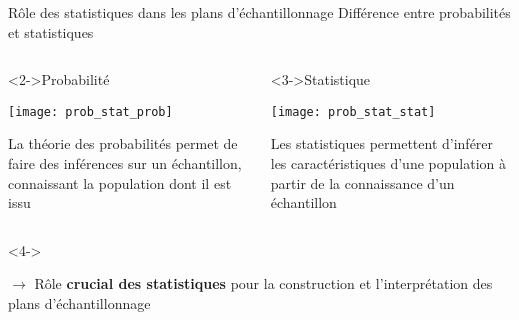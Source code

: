 \documentclass[10pt]{beamer}
\begin{document}
\begin{frame}{Rôle des statistiques dans les plans d’échantillonnage}
  Différence entre probabilités et statistiques
  \begin{columns}[c]
    \begin{column}[c]{0.5\textwidth}
      \begin{block}<2->{Probabilité}
        \begin{center}
          \texttt{[image: prob\_stat\_prob]}
        \end{center}
        \begin{small}
          La théorie des probabilités permet de faire des inférences sur un échantillon, connaissant la population dont il est issu
        \end{small}
      \end{block}
    \end{column}
    \begin{column}[c]{0.5\textwidth}
      \begin{block}<3->{Statistique}
        \begin{center}
          \texttt{[image: prob\_stat\_stat]}
        \end{center}
        \begin{small}
          Les statistiques permettent d’inférer les caractéristiques
          d’une population à partir de la connaissance d’un échantillon
        \end{small}
      \end{block}
    \end{column}
  \end{columns}
  \begin{alertblock}<4->{}
    \begin{center}
      $\rightarrow$ Rôle \textbf{crucial des statistiques} pour la construction et l’interprétation des plans d’échantillonnage   
    \end{center}
  \end{alertblock}
\end{frame}
\end{document}
